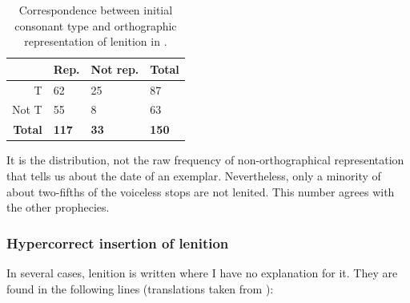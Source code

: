 \begin{table}[h]
\centering
\begin{tabular}{@{}rlll@{}}
\toprule
 & \textbf{Rep.} & \textbf{Not rep.} & \textbf{Total} \\ \midrule
T & 62 & 25 & 87 \\
Not T & 55 & 8 & 63 \\
\textbf{Total} & \textbf{117} & \textbf{33} & \textbf{150} \\ \bottomrule
\end{tabular}
\caption{Correspondence between initial consonant type and orthographic representation of lenition in .}
\label{armesprydeinnumbers}
\end{table}


It is the distribution, not the raw frequency of non-orthographical representation that tells us about the date of an exemplar. Nevertheless, only a minority of about two-fifths of the voiceless stops are not lenited. This number agrees with the other prophecies.

\subsubsection{Hypercorrect insertion of lenition}
In several cases, lenition is written where I have no explanation for it. They are found in the following lines (translations taken from \textcite{williams_armes_1972}):

\begin{mwl}
\end{mwl}

